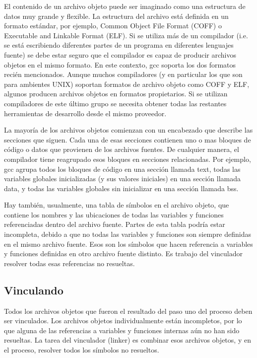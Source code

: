 \documentclass[output=paper, 
colorlinks,
citecolor=brown,
newtxmath
]{langscibook}
\begin{document}
El contenido de un archivo objeto puede ser imaginado como una estructura de datos
muy grande y flexible. La estructura del archivo está definida en un formato estándar, 
por ejemplo, Common Object File Format (COFF) o Executable and Linkable Format (ELF).
Si se utiliza más de un compilador (i.e. se está escribiendo diferentes partes de un programa
en diferentes lenguajes fuente) se debe estar seguro que el compilador es capaz
de producir archivos objetos en el mismo formato. En este contexto, gcc soporta 
los dos formatos recién mencionados. Aunque muchos compiladores (y en particular
los que son para ambientes UNIX) soportan formatos de archivo objeto como
COFF y ELF, algunos producen archivos objetos en formatos propietarios.
Si se utilizan compiladores de este último grupo se necesita obtener todas
las restantes herramientas de desarrollo desde el mismo proveedor.


La mayoría de los archivos objetos comienzan con un encabezado que describe las secciones
que siguen. Cada una de esas secciones contienen uno o mas bloques de código o datos que 
provienen de los archivos fuentes. De cualquier manera, el compilador tiene reagrupado
esos bloques en secciones relacionadas. Por ejemplo, gcc agrupa todos los bloques de
código en una sección llamada text, todas las variables globales inicializadas (y sus
valores iniciales) en una sección llamada data, y todas las variables globales sin 
inicializar en una sección llamada bss.

Hay también, usualmente, una tabla de símbolos en el archivo objeto, que contiene
los nombres y las ubicaciones de todas las variables y funciones referenciadas dentro
del archivo fuente. Partes de esta tabla podría estar incompleta, debido a que
no todas las variables y funciones son siempre definidas en el mismo archivo fuente. 
Esos son los símbolos que hacen referencia a variables y funciones definidas en 
otro archivo fuente distinto. Es trabajo del vinculador resolver todas esas referencias
no resueltas.

\subsection {Vinculando}

Todos los archivos objetos que fueron el resultado del paso uno del proceso deben
ser vinculados. Los archivos objetos individualmente están incompletos, por lo que
alguna de las referencias a variables y funciones internas aún no han sido resueltas.
La tarea del vinculador (linker) es combinar esos archivos objetos, y en el proceso,
resolver todos los símbolos no resueltos.
\end{document}

